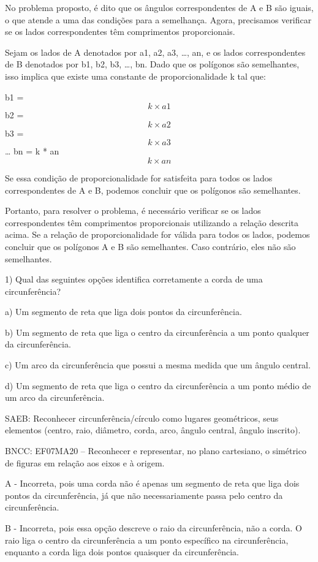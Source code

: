 No problema proposto, é dito que os ângulos correspondentes de A e B são
iguais, o que atende a uma das condições para a semelhança. Agora,
precisamos verificar se os lados correspondentes têm comprimentos
proporcionais.

Sejam os lados de A denotados por a1, a2, a3, \ldots, an, e os lados
correspondentes de B denotados por b1, b2, b3, \ldots, bn. Dado que os
polígonos são semelhantes, isso implica que existe uma constante de
proporcionalidade k tal que:

b1 = \[k \times a1\] b2 = \[k \times a2\] b3 = \[k \times a3\] \ldots{}
bn = k * an \[k \times an\]

Se essa condição de proporcionalidade for satisfeita para todos os lados
correspondentes de A e B, podemos concluir que os polígonos são
semelhantes.

Portanto, para resolver o problema, é necessário verificar se os lados
correspondentes têm comprimentos proporcionais utilizando a relação
descrita acima. Se a relação de proporcionalidade for válida para todos
os lados, podemos concluir que os polígonos A e B são semelhantes. Caso
contrário, eles não são semelhantes.


1) Qual das seguintes opções identifica corretamente a corda de uma
circunferência?

a) Um segmento de reta que liga dois pontos da circunferência.

b) Um segmento de reta que liga o centro da circunferência a um ponto
qualquer da circunferência.

c) Um arco da circunferência que possui a mesma medida que um ângulo
central.

d) Um segmento de reta que liga o centro da circunferência a um ponto
médio de um arco da circunferência.

SAEB: Reconhecer circunferência/círculo como lugares geométricos, seus
elementos (centro, raio, diâmetro, corda, arco, ângulo central, ângulo
inscrito).

BNCC: EF07MA20 -- Reconhecer e representar, no plano cartesiano, o
simétrico de figuras em relação aos eixos e à origem.

A - Incorreta, pois uma corda não é apenas um segmento de reta que liga
dois pontos da circunferência, já que não necessariamente passa pelo
centro da circunferência.

B - Incorreta, pois essa opção descreve o raio da circunferência, não a
corda. O raio liga o centro da circunferência a um ponto específico na
circunferência, enquanto a corda liga dois pontos quaisquer da
circunferência.

